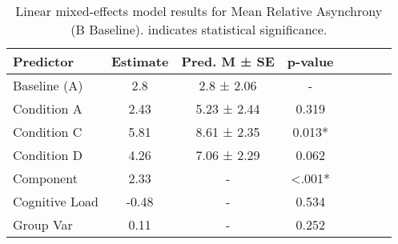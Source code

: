 
    \begin{table}[H]
    \centering
    \begin{small}
    \begin{tabular}{lccccccc}
\toprule
Predictor & Estimate & Pred. M ± SE & p-value \\
\midrule
Baseline (A) & 2.8 & 2.8 ± 2.06 & - \\
Condition A & 2.43 & 5.23 ± 2.44 & 0.319 \\
Condition C & 5.81 & 8.61 ± 2.35 & 0.013* \\
Condition D & 4.26 & 7.06 ± 2.29 & 0.062 \\
Component & 2.33 & - & <.001* \\
Cognitive Load & -0.48 & - & 0.534 \\
Group Var & 0.11 & - & 0.252 \\
\bottomrule
\end{tabular}

    \end{small}
    \caption[Linear mixed-effects model results for Mean Relative Asynchrony (B Baseline)]{Linear mixed-effects model results for Mean Relative Asynchrony (B Baseline). \newline * indicates statistical significance.}
    \label{tab:meanrelativeasynchrony (b baseline)}

    \end{table}